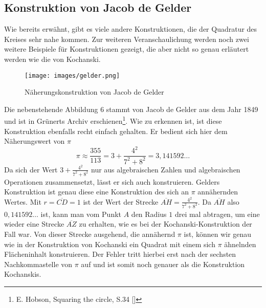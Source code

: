 \documentclass[11pt]{article}
\begin{document}
 \subsection{Konstruktion von Jacob de Gelder}
 Wie bereits erwähnt, gibt es viele andere Konstruktionen, die der Quadratur des Kreises sehr nahe kommen. Zur weiteren Veranschaulichung werden noch zwei weitere Beispiele für Konstruktionen gezeigt, die aber nicht so genau erläutert werden wie die von Kochanski. 
\begin{wrapfigure}{l}{0.5\textwidth}
  \begin{center}
    \texttt{[image: images/gelder.png]}
  \end{center}
  \caption{Näherungskonstruktion von Jacob de Gelder}
\end{wrapfigure}
Die nebenstehende Abbildung 6 stammt von Jacob de Gelder aus dem Jahr 1849 und ist in Grünerts Archiv erschienen\footnote{E. Hobson, Squaring the circle, S.34 [\HobsonInt]}. Wie zu erkennen ist, ist diese Konstruktion ebenfalls recht einfach gehalten. Er bedient sich hier dem Näherungswert von $\pi$ \[\pi\approx\frac{355}{113}=3+\frac{4^2}{7^2+8^2}=3,141592\dots\] Da sich der Wert $3+\frac{4^2}{7^2+8^2}$ nur aus algebraischen Zahlen und algebraischen Operationen zusammensetzt, lässt er sich auch konstruieren. Gelders Konstruktion ist genau diese eine Konstruktion des sich an $\pi$ annähernden Wertes. Mit $r=\overline{CD}=1$ ist der Wert der Strecke $\overline{AH}=\frac{4^2}{7^2+8^2}$. Da $\overline{AH}$ also $0,141592\dots$ ist, kann man vom Punkt $A$ den Radius $1$ drei mal abtragen, um eine wieder eine Strecke $\overline{AZ}$ zu erhalten, wie es bei der Kochanski-Konstruktion der Fall war. Von dieser Strecke ausgehend, die annähernd $\pi$ ist, können wir genau wie in der Konstruktion von Kochanski ein Quadrat mit einem sich $\pi$ ähnelnden Flächeninhalt konstruieren. Der Fehler tritt hierbei erst nach der sechsten Nachkommastelle von $\pi$ auf und ist somit noch genauer als die Konstruktion Kochanskis.
\clearpage\newpage
\end{document}
